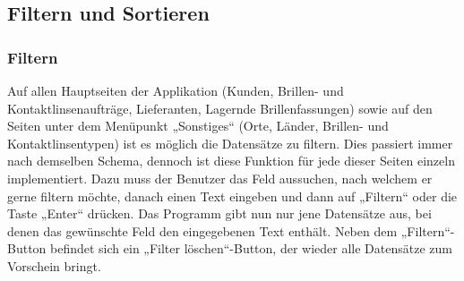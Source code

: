 \subsection{Filtern und Sortieren}
\subsubsection{Filtern}
Auf allen Hauptseiten der Applikation (Kunden, Brillen- und Kontaktlinsenaufträge, Lieferanten, Lagernde Brillenfassungen) sowie auf den Seiten unter dem Menüpunkt „Sonstiges“ (Orte, Länder, Brillen- und Kontaktlinsentypen) ist es möglich die Datensätze zu filtern. Dies passiert immer nach demselben Schema, dennoch ist diese Funktion für jede dieser Seiten einzeln implementiert.
Dazu muss der Benutzer das Feld aussuchen, nach welchem er gerne filtern möchte, danach einen Text eingeben und dann auf „Filtern“  oder die Taste „Enter“ drücken. Das Programm gibt nun nur jene Datensätze aus, bei denen das gewünschte Feld den eingegebenen Text enthält. Neben dem „Filtern“-Button befindet sich ein „Filter löschen“-Button, der wieder alle Datensätze zum Vorschein bringt.

